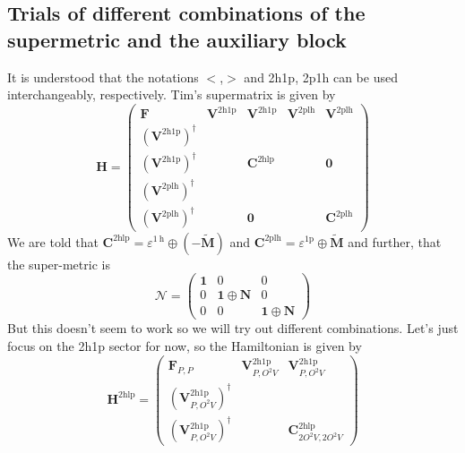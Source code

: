 \subsection{Trials of different combinations of the supermetric and the auxiliary block}
It is understood that the notations $<$,$>$ and 2h1p, 2p1h can be used interchangeably, respectively. Tim's supermatrix is given by
\begin{equation}
\bm{H} =
\begin{pmatrix}
\bm{F} & \bm{V}^{2\mathrm{h1p}} & \bm{V}^{2\mathrm{h1p}} & \bm{V}^{2\mathrm{plh}} & \bm{V}^{2\mathrm{plh}} \\
\left(\bm{V}^{2\mathrm{h1p}}\right)^{\dagger} &  &  & & \\
\left(\bm{V}^{2\mathrm{h1p}}\right)^{\dagger} &  & \bm{C}^{2\mathrm{hlp}} & & \bm{0} \\
\left(\bm{V}^{2\mathrm{plh}}\right)^{\dagger} & & & & \\
\left(\bm{V}^{2\mathrm{plh}}\right)^{\dagger} &  & \bm{0} & & \bm{C}^{2\mathrm{plh}}
\end{pmatrix}
\end{equation}
We are told that $\mathbf{C}^{2 \mathrm{hlp}}=\varepsilon^{1 \mathrm{~h}} \oplus(-\tilde{\mathbf{M}})$ and $\mathbf{C}^{2 \mathrm{plh}}=\varepsilon^{1 \mathrm{p}} \oplus \tilde{\mathbf{M}}$ and further, that the super-metric is
\begin{equation}
    \bm{\mathcal{N}} = \begin{pmatrix}
\bm{1} & 0 & 0 \\
0 & \bm{1} \oplus \bm{N} & 0 \\
0 & 0 & \bm{1} \oplus \bm{N}
    \end{pmatrix}
\end{equation}
But this doesn't seem to work so we will try out different combinations. Let's just focus on the 2h1p sector for now, so the Hamiltonian is given by
\begin{equation}
    \bm{H}^{2 \mathrm{hlp}} = 
    \begin{pmatrix}
        \bm{F}_{P,P} & \bm{V}^{2\mathrm{h1p}}_{P,O^2V} & \bm{V}^{2\mathrm{h1p}}_{P,O^2V} \\
        \left(\bm{V}^{2\mathrm{h1p}}_{P,O^2V}\right)^{\dagger} &  &  \\
        \left(\bm{V}^{2\mathrm{h1p}}_{P,O^2V}\right)^{\dagger} &  & \bm{C}^{2\mathrm{hlp}}_{2O^2V,2O^2V}
    \end{pmatrix}
\end{equation}

